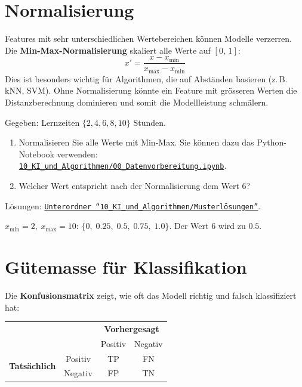 \section{Normalisierung}

\begin{mydefinition}
    Features mit sehr unterschiedlichen Wertebereichen können Modelle verzerren.
    Die \textbf{Min-Max-Normalisierung} skaliert alle Werte auf $[0,\,1]$:
    \[
        x' = \frac{x - x_{\min}}{x_{\max} - x_{\min}}
    \]
    Dies ist besonders wichtig für Algorithmen, die auf Abständen basieren (z.\,B. kNN, SVM). Ohne Normalisierung könnte ein Feature mit grösseren Werten die Distanzberechnung dominieren und somit die Modellleistung schmälern.
\end{mydefinition}

\begin{myexercise}
    Gegeben: Lernzeiten $\{2, 4, 6, 8, 10\}$ Stunden.
    \begin{enumerate}
        \item Normalisieren Sie alle Werte mit Min-Max. Sie können dazu das Python-Notebook verwenden: \href{\notebookurl}{\texttt{10\_KI\_und\_Algorithmen/00\_Datenvorbereitung.ipynb}}.
        \item Welcher Wert entspricht nach der Normalisierung dem Wert 6?
    \end{enumerate}
    \begin{myanswer}
        Lösungen: \href{\notebookurl}{\texttt{Unterordner \enquote{10\_KI\_und\_Algorithmen/Musterlösungen}}}.\

        $x_{\min}=2,\ x_{\max}=10$:
        $\{0,\; 0.25,\; 0.5,\; 0.75,\; 1.0\}$.
        Der Wert 6 wird zu $0.5$.
    \end{myanswer}
\end{myexercise}

\section{Gütemasse für Klassifikation}

\begin{mydefinition}[Konfusionsmatrix]
    Die \textbf{Konfusionsmatrix} zeigt, wie oft das Modell richtig und falsch klassifiziert hat:

    \begin{center}
        \begin{tabular}{cc|cc}
                                                  &         & \multicolumn{2}{c}{\textbf{Vorhergesagt}} \\
                                                  &         & Positiv                                      & Negativ \\
            \hline
            \multirow{2}{*}{\textbf{Tatsächlich}} & Positiv & TP                                           & FN \\
                                                  & Negativ & FP                                           & TN \\
        \end{tabular}
    \end{center}
\end{mydefinition}

